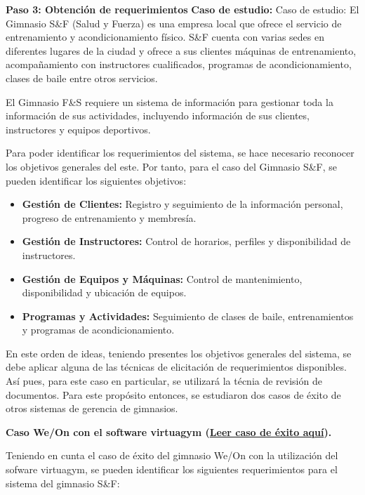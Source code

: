 \textbf{Paso 3: Obtención de requerimientos}
\textbf{Caso de estudio:} Caso de estudio: El Gimnasio S\&F (Salud y Fuerza) es una empresa local que ofrece el servicio de entrenamiento y acondicionamiento físico. S\&F cuenta con varias sedes en diferentes lugares de la ciudad y ofrece a sus clientes máquinas de entrenamiento, acompañamiento con instructores cualificados, programas de acondicionamiento, clases de baile entre otros servicios.

El Gimnasio F\&S requiere un sistema de información para gestionar toda la información de sus actividades, incluyendo información de sus clientes, instructores y equipos deportivos.

Para poder identificar los requerimientos del sistema, se hace necesario reconocer los objetivos generales del este. Por tanto, para el caso del Gimnasio S\&F, se pueden identificar los siguientes objetivos:

\begin{itemize}
    \item \textbf{Gestión de Clientes:} Registro y seguimiento de la información personal, progreso de entrenamiento y membresía.
    \item \textbf{Gestión de Instructores:} Control de horarios, perfiles y disponibilidad de instructores.
    \item \textbf{Gestión de Equipos y Máquinas:} Control de mantenimiento, disponibilidad y ubicación de equipos.
    \item \textbf{Programas y Actividades:} Seguimiento de clases de baile, entrenamientos y programas de acondicionamiento.
\end{itemize}

En este orden de ideas, teniendo presentes los objetivos generales del sistema, se debe aplicar alguna de las técnicas de elicitación de requerimientos disponibles. Así pues, para este caso en particular, se utilizará la técnia de revisión de documentos. Para este propósito entonces, se estudiaron dos casos de éxito de otros sistemas de gerencia de gimnasios.

\textbf{Caso We/On con el software virtuagym (\href{https://business.virtuagym.com/es/cliente/we-on/}{Leer caso de éxito aquí}).}

Teniendo en cunta el caso de éxito del gimnasio We/On con la utilización del sofware virtuagym, se pueden identificar los siguientes requerimientos para el sistema del gimnasio S\&F:

